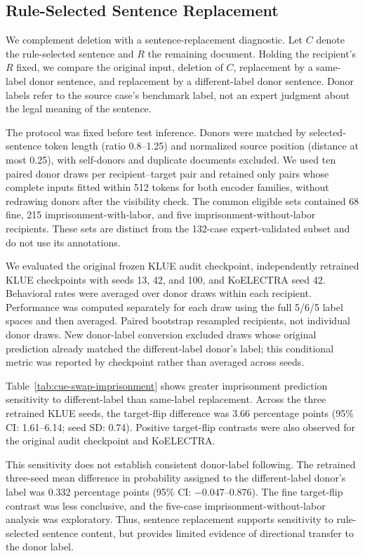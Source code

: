 \subsection{Rule-Selected Sentence Replacement}
\label{sec:cue-swap}

We complement deletion with a sentence-replacement diagnostic.
Let $C$ denote the rule-selected sentence and $R$ the remaining document.
Holding the recipient's $R$ fixed, we compare the original input,
deletion of $C$, replacement by a same-label donor sentence, and
replacement by a different-label donor sentence.
Donor labels refer to the source case's benchmark label, not an expert
judgment about the legal meaning of the sentence.

The protocol was fixed before test inference.
Donors were matched by selected-sentence token length
(ratio 0.8--1.25) and normalized source position
(distance at most 0.25), with self-donors and duplicate documents excluded.
We used ten paired donor draws per recipient--target pair and retained
only pairs whose complete inputs fitted within 512 tokens for both
encoder families, without redrawing donors after the visibility check.
The common eligible sets contained 68 fine, 215 imprisonment-with-labor,
and five imprisonment-without-labor recipients.
These sets are distinct from the 132-case expert-validated subset and
do not use its annotations.

We evaluated the original frozen KLUE audit checkpoint, independently
retrained KLUE checkpoints with seeds 13, 42, and 100, and KoELECTRA seed 42.
Behavioral rates were averaged over donor draws within each recipient.
Performance was computed separately for each draw using the full
5/6/5 label spaces and then averaged.
Paired bootstrap resampled recipients, not individual donor draws.
New donor-label conversion excluded draws whose original prediction
already matched the different-label donor's label; this conditional
metric was reported by checkpoint rather than averaged across seeds.

Table~\ref{tab:cue-swap-imprisonment} shows greater imprisonment
prediction sensitivity to different-label than same-label replacement.
Across the three retrained KLUE seeds, the target-flip difference was
3.66 percentage points (95\% CI: 1.61--6.14; seed SD: 0.74).
Positive target-flip contrasts were also observed for the original
audit checkpoint and KoELECTRA.

This sensitivity does not establish consistent donor-label following.
The retrained three-seed mean difference in probability assigned to the
different-label donor's label was 0.332 percentage points
(95\% CI: $-0.047$--0.876).
The fine target-flip contrast was less conclusive, and the five-case
imprisonment-without-labor analysis was exploratory.
Thus, sentence replacement supports sensitivity to rule-selected
sentence content, but provides limited evidence of directional transfer
to the donor label.

